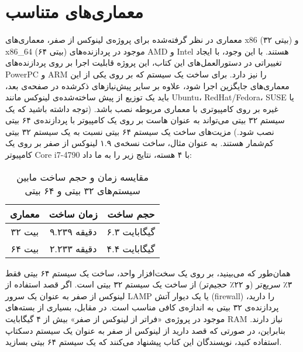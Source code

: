 \documentclass{book}
\begin{document}
\newpage

\section{معماری‌های متناسب}

معماری در نظر گرفته‌شده برای پروژه‌ی لینوکس از صفر، معماری‌های x86 (۳۲ بیتی) و x86\_64 (۶۴ بیتی) موجود در پردازنده‌های AMD و Intel هستند. با این وجود، با ایجاد تغییراتی در دستورالعمل‌های این کتاب، این پروژه قابلیت اجرا بر روی پردازنده‌های PowerPC و ARM را نیز دارد. برای ساخت یک سیستم که بر روی یکی از این معماری‌های جایگزین اجرا شود، علاوه بر سایر پیش‌نیازهای ذکرشده در صفحه‌ی بعد، باید یک توزیع از پیش ساخته‌شده‌ی لینوکس مانند Ubuntu، RedHat/Fedora، SUSE یا غیره بر روی کامپیوتری با معماری مربوطه نصب باشد. (توجه داشته باشید که یک سیستم ۳۲ بیتی می‌تواند به عنوان هاست بر روی یک کامپیوتر با پردازنده‌ی ۶۴ بیتی نصب شود.)
\newline
\newline
مزیت‌های ساخت یک سیستم ۶۴ بیتی نسبت به یک سیستم ۳۲ بیتی کم‌شمار هستند. به عنوان مثال، ساخت نسخه‌ی ۱.۹ لینوکس از صفر بر روی یک کامپیوتر Core i7-4790 با ۴ هسته، نتایج زیر را به ما داد:
\newline
\newline
\begin{table}[h]
    \centering
    \begin{tabular}{|c|c|c|}
        \hline
        معماری & زمان ساخت & حجم ساخت \\
        \hline
        ۳۲ بیت   & ۹.۲۳۹ دقیقه   & ۶.۳ گیگابایت   \\
        ۶۴ بیت   & ۲.۲۳۳ دقیقه   & ۴.۴ گیگابایت   \\
        \hline
    \end{tabular}
    \caption{مقایسه زمان و حجم ساخت مابین سیستم‌های ۳۲ بیتی و ۶۴ بیتی}
    \label{tab:example}
\end{table}
\newline
\newline
همان‌طور که می‌بینید، بر روی یک سخت‌افزار واحد، ساخت یک سیستم ۶۴ بیتی فقط ۳٪ سریع‌تر (و ۲۲٪ حجیم‌تر) از ساخت یک سیستم ۳۲ بیتی است. اگر قصد استفاده از لینوکس از صفر به عنوان یک سرور LAMP یا یک دیوار آتش (firewall) را دارید، پردازنده‌ی ۳۲ بیتی به اندازه‌ی کافی مناسب است. در مقابل، بسیاری از بسته‌های موجود در پروژه‌ی «فراتر از لینوکس از صفر» بیش از ۴ گیگابایت RAM نیاز دارند. بنابراین، در صورتی که قصد دارید از لینوکس از صفر به عنوان یک سیستم دسکتاپ استفاده کنید، نویسندگان این کتاب پیشنهاد می‌کنند که یک سیستم ۶۴ بیتی بسازید.
\end{document}
